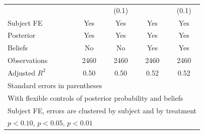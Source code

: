 \begin{table}[htbp]
\begin{tabular}{l*{4}{c}}
                &                  &    (0.1)         &                  &    (0.1)         \\
Subject FE      &      Yes         &      Yes         &      Yes         &      Yes         \\
Posterior       &      Yes         &      Yes         &      Yes         &      Yes         \\
Beliefs         &       No         &       No         &      Yes         &      Yes         \\
\hline
Observations    &     2460         &     2460         &     2460         &     2460         \\
Adjusted \(R^{2}\)&     0.50         &     0.50         &     0.52         &     0.52         \\
\hline\hline
\multicolumn{5}{l}{\footnotesize Standard errors in parentheses}\\
\multicolumn{5}{l}{\footnotesize With flexible controls of posterior probability and beliefs}\\
\multicolumn{5}{l}{\footnotesize Subject FE, errors are clustered by subject and by treatment}\\
\multicolumn{5}{l}{\footnotesize \sym{*} \(p<0.10\), \sym{**} \(p<0.05\), \sym{***} \(p<0.01\)}\\
\end{tabular}
\end{table}
